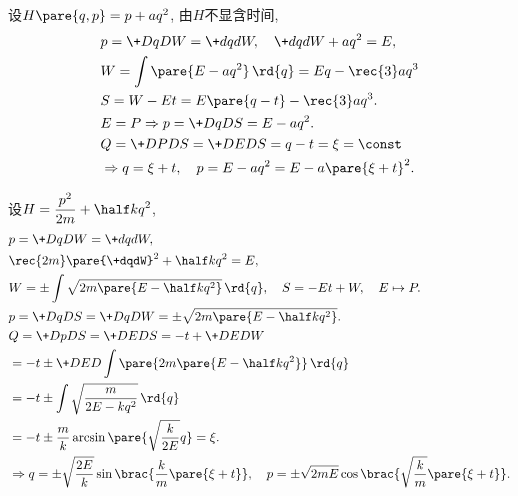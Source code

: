 \documentclass{ctexart}
\begin{document}
\begin{sample}
    \begin{ex}
        设$H\pare{q,p} = p + aq^2$, 由$H$不显含时间,
        \begin{align*}
            & p = \+DqDW = \+dqdW,\quad \+dqdW + aq^2 = E, \\
            & W = \int\pare{E-aq^2}\,\rd{q} = Eq - \rec{3}aq^3 \\
            & S = W-Et = E\pare{q-t} - \rec{3}aq^3. \\
            & E=P\Rightarrow p = \+DqDS = E-aq^2. \\
            & Q = \+DPDS = \+DEDS = q-t = \xi = \const\\
            & \Rightarrow q = \xi + t,\quad p = E-aq^2 = E-a\pare{\xi+t}^2.
        \end{align*}
    \end{ex}
\end{sample}

\begin{sample}
    \begin{ex}
        设$\displaystyle H = \frac{p^2}{2m} + \half kq^2$,
        \begin{align*}
            & p = \+DqDW = \+dqdW, \\
            & \rec{2m}\pare{\+dqdW}^2 + \half kq^2 = E, \\
            & W = \pm \int \sqrt{2m\pare{E-\half kq^2}}\,\rd{q},\quad S = -Et+W, \quad E\mapsto P. \\
            & p = \+DqDS = \+DqDW = \pm\sqrt{2m\pare{E - \half kq^2}}. \\
            & Q = \+DpDS = \+DEDS = -t + \+DEDW \\
            &= -t \pm \+DED{} \int\pare{2m\pare{E-\half kq^2}}\,\rd{q} \\
            &= -t \pm \int \sqrt{\frac{m}{2E-kq^2}}\,\rd{q} \\
            &= -t \pm \frac{m}{k}\arcsin\pare{\sqrt{\frac{k}{2E}}q} = \xi. \\
            &\Rightarrow q = \pm \sqrt{\frac{2E}{k}}\sin\brac{\frac{k}{m}\pare{\xi + t}},\quad p = \pm\sqrt{2mE}\cos\brac{\sqrt{\frac{k}{m}}\pare{\xi + t}}.
        \end{align*}
    \end{ex}
\end{sample}
\end{document}
